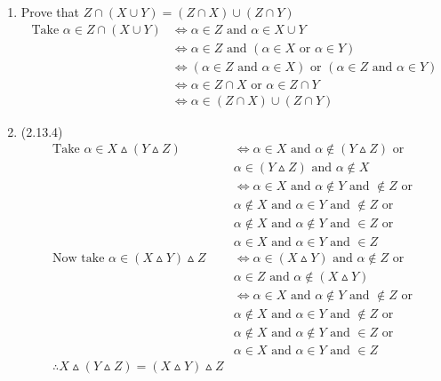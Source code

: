 \begin{enumerate}
    \item Prove that $Z \cap (X \cup Y) = (Z \cap X) \cup (Z \cap Y)$
        \begin{align*}
            \text{Take } \alpha \in Z \cap (X \cup Y) &\Leftrightarrow \alpha \in Z \text{ and } \alpha \in X \cup Y\\
            &\Leftrightarrow \alpha \in Z \text{ and } (\alpha \in X \text{ or } \alpha \in Y)\\
            &\Leftrightarrow (\alpha \in Z \text{ and } \alpha \in X) \text{ or } (\alpha \in Z \text{ and } \alpha \in Y)\\
            &\Leftrightarrow \alpha \in Z \cap X \text{ or } \alpha \in Z \cap Y\\
            &\Leftrightarrow \alpha \in (Z \cap X) \cup (Z \cap Y)
        \end{align*}

    \item (2.13.4)
    \begin{align*}
        \text{Take } \alpha \in X \vartriangle (Y \vartriangle Z) &\Leftrightarrow \alpha \in X \text{ and } \alpha \notin (Y \vartriangle Z) \text{ or }\\
        &\alpha \in (Y \vartriangle Z) \text{ and } \alpha \notin X\\
        &\Leftrightarrow \alpha \in X \text{ and } \alpha \notin Y \text{ and } \notin Z \text{ or }\\ 
        &\alpha \notin X \text{ and } \alpha \in Y \text{ and } \notin Z \text{ or }\\ 
        &\alpha \notin X \text{ and } \alpha \notin Y \text{ and } \in Z \text{ or }\\ 
        &\alpha \in X \text{ and } \alpha \in Y \text{ and } \in Z\\
        \text{Now take } \alpha \in (X \vartriangle Y) \vartriangle Z &\Leftrightarrow \alpha \in (X \vartriangle Y) \text{ and } \alpha \notin Z \text{ or }\\ 
        &\alpha \in Z \text{ and } \alpha \notin (X \vartriangle Y)\\
        &\Leftrightarrow \alpha \in X \text{ and } \alpha \notin Y \text{ and } \notin Z \text{ or }\\ 
        &\alpha \notin X \text{ and } \alpha \in Y \text{ and } \notin Z \text{ or }\\ 
        &\alpha \notin X \text{ and } \alpha \notin Y \text{ and } \in Z \text{ or }\\ 
        &\alpha \in X \text{ and } \alpha \in Y \text{ and } \in Z\\
        \therefore X \vartriangle (Y \vartriangle Z) = (X \vartriangle Y) \vartriangle Z
    \end{align*}


\end{enumerate}
